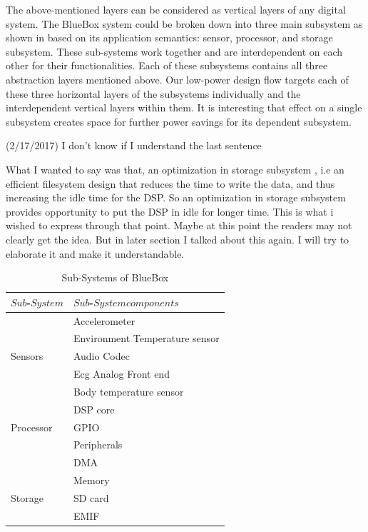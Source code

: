 The above-mentioned layers can be considered as vertical layers of
any digital system. The BlueBox system could be broken down into
three main subsystem as shown in  based on its
application semantics: sensor, processor, and storage subsystem.
These sub-systems work together and are interdependent on each other
for their functionalities. Each of these subsystems contains all
three abstraction layers mentioned above. Our low-power design flow
targets each of these three horizontal layers of the subsystems
individually and the interdependent vertical layers within them. It
is interesting that effect on a single subsystem creates space for
further power savings for its dependent subsystem. 
\begin{cmtPai}
	(2/17/2017) I don't know if I understand the last sentence
\end{cmtPai}
 \begin{cmtSMS}
 	What I wanted to say was that, an optimization in storage subsystem , i.e an efficient filesystem design that reduces the time to write the data, and thus increasing the idle time for the DSP. So an optimization in storage subsystem provides opportunity to put the DSP in idle for longer time. This is what i wished to express through that point.
 	Maybe at this point the readers may not clearly get the idea. But in later section I talked about this again. I will try to elaborate it and make it understandable.
 \end{cmtSMS}
  \begin{table}
 	\caption{Sub-Systems of BlueBox}
 	\label{table:sub-system}
 	\centering
 	\begin{tabular}{|l|l|}
 		\hline
 		$Sub$-$System$ & $Sub$-$System  components$  \\
 		\hline
 		& Accelerometer \\
 		& Environment Temperature sensor \\
 		Sensors & Audio Codec \\
 		& Ecg Analog Front end \\
 		& Body temperature sensor\\
 		\hline
 		& DSP core \\
 		Processor & GPIO \\
 		& Peripherals \\
 		& DMA \\
 		& Memory \\
 		\hline
 		Storage & SD card \\
 		& EMIF \\
 		\hline
 	\end{tabular}
 \end{table}
 
